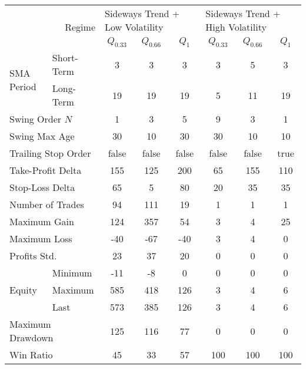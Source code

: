 \begin{tabular}{ll|cccccc}
    \toprule
    \multicolumn{2}{r|}{\multirow{2}{*}{Regime}} & \multicolumn{3}{l}{Sideways Trend + Low Volatility} & \multicolumn{3}{l}{Sideways Trend + High Volatility}  \\
    \multicolumn{2}{r|}{} & $Q_{0.33}$ & $Q_{0.66}$ & $Q_{1}$ & $Q_{0.33}$ & $Q_{0.66}$ & $Q_{1}$ \\
    \midrule
    \multirow{2}{*}{SMA Period}            & Short-Term & 3   & 3   & 3   & 3  & 5   & 3   \\
    & Long-Term  & 19  & 19  & 19  & 5  & 11  & 19  \\
    \multicolumn{2}{l|}{Swing Order $N$} & 1 & 3 & 5 & 9 & 3 & 1 \\
    \multicolumn{2}{l|}{Swing Max Age} & 30 & 10 & 30 & 30 & 10 & 10 \\
    \multicolumn{2}{l|}{Trailing Stop Order} & false & false & false & false & false & true \\
    \multicolumn{2}{l|}{Take-Profit Delta} & 155 & 125 & 200 & 65 & 155 & 110 \\
    \multicolumn{2}{l|}{Stop-Loss Delta} & 65 & 5 & 80 & 20 & 35 & 35 \\
    \midrule
    \multicolumn{2}{l|}{Number of Trades} & 94 & 111 & 19 & 1 & 1 & 1 \\
    \multicolumn{2}{l|}{Maximum Gain} & 124 & 357 & 54 & 3 & 4 & 25 \\
    \multicolumn{2}{l|}{Maximum Loss} & -40 & -67 & -40 & 3 & 4 & 0 \\
    \multicolumn{2}{l|}{Profits Std.} & 23 & 37 & 20 & 0 & 0 & 0 \\
    \multirow{3}{*}{Equity}                & Minimum    & -11 & -8  & 0   & 0  & 0   & 0   \\
    & Maximum    & 585 & 418 & 126 & 3  & 4   & 6   \\
    & Last       & 573 & 385 & 126 & 3  & 4   & 6   \\
    \multicolumn{2}{l|}{Maximum Drawdown} & 125 & 116 & 77 & 0 & 0 & 0 \\
    \multicolumn{2}{l|}{Win Ratio} & 45 & 33 & 57 & 100 & 100 & 100 \\
    \bottomrule
\end{tabular}